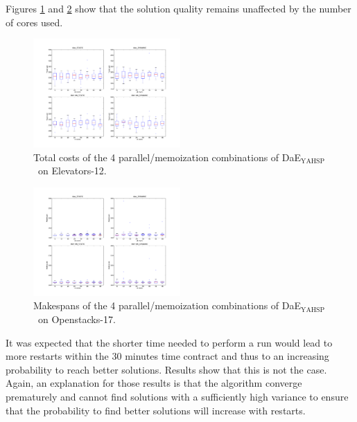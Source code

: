 \documentclass{sig-alternate}
\newcommand{\DAEYAHSP}{{\sc DaE$_{\text{YAHSP}}$}}
\newcommand{\OPENSTACKS}{{\sc Openstacks}}
\newcommand{\ELEVATORS}{{\sc Elevators}}
\begin{document}
Figures \ref{fig:exp2_totalcost_elevators-12_pop_96} and \ref{fig:exp2_makespan_openstacks-17_pop_96} show that the solution quality remains unaffected by the number of cores used.

\begin{figure}[htpb]
\begin{center}
\includegraphics[width=0.5\textwidth]{images/EXP2_Total_cost_IPC6_SEQ_ELEVATORS_12_S96.pdf}
\caption{Total costs of the 4 parallel/memoiza\-tion combinations of \DAEYAHSP\ on \ELEVATORS-12.}
\label{fig:exp2_totalcost_elevators-12_pop_96}
\end{center}
\end{figure}

\begin{figure}[htpb]
\begin{center}
\includegraphics[width=0.5\textwidth]{images/EXP2_Makespan_IPC6_TEMPO_OPENSTACKS_17_S96.pdf}
\caption{Makespans of the 4 parallel/memoiza\-tion combinations of \DAEYAHSP\ on \OPENSTACKS-17.}
\label{fig:exp2_makespan_openstacks-17_pop_96}
\end{center}
\end{figure}

It was expected that the shorter time needed to perform a run would lead
to more restarts within the 30 minutes time contract and thus to an increasing
probability to reach better solutions. Results show that this is not the case.
Again, an explanation for those results is that the
algorithm converge prematurely and cannot find solutions with a sufficiently
high variance to ensure that the probability to find better solutions will
increase with restarts.
\end{document}
